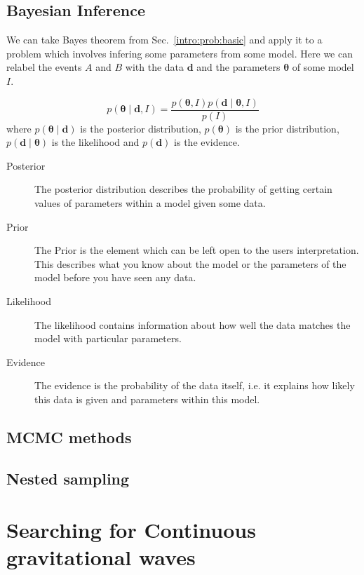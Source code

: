 \subsection{\label{intro:prob:bayes}Bayesian Inference}

We can take Bayes theorem from Sec.~\ref{intro:prob:basic} and apply it to a problem which involves infering some parameters from some model. Here we can relabel the events $A$ and $B$ with the data ${\bm d}$ and the parameters ${\bm \theta}$ of some model $I$.

\begin{equation}
p({\bm \theta} \mid {\bm d}, I) = \frac{p({\bm \theta}, I)p({\bm d} \mid {\bm \theta}, I)}{p(I)}
\end{equation}
where $p({\bm \theta} \mid {\bm d})$ is the posterior distribution, $p({\bm \theta})$ is the prior distribution,  $p({\bm d} \mid {\bm \theta})$ is the likelihood and $p({\bm d})$ is the evidence.

\begin{description}
\item [Posterior]
The posterior distribution describes the probability of getting certain values of parameters within a model given some data. 
\item [Prior]
The Prior is the element which can be left open to the users interpretation. This describes what you know about the model or the parameters of the model before you have seen any data. 
\item [Likelihood]
The likelihood contains information about how well the data matches the model with particular parameters. 
\item [Evidence]
The evidence is the probability of the data itself, i.e. it explains how likely this data is given and parameters within this model. 
\end{description}

\subsection{MCMC methods}

\subsection{Nested sampling}

\section{\label{intro:search}Searching for Continuous gravitational waves}

